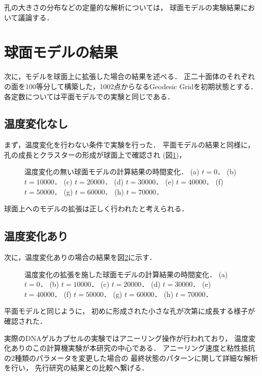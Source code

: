 孔の大きさの分布などの定量的な解析については，
球面モデルの実験結果において議論する．


\section{球面モデルの結果}
次に，モデルを球面上に拡張した場合の結果を述べる．
正二十面体のそれぞれの面を100等分して構築した，1002点からなるGeodesic Gridを初期状態とする．
各定数については平面モデルでの実験と同じである．


\subsection{温度変化なし}
まず，温度変化を行わない条件で実験を行った．
平面モデルの結果と同様に，
孔の成長とクラスターの形成が球面上で確認され
(図\ref{fig:result_sphere_without_anearing})，
\begin{figure}
    \centering
    
    \caption{
        温度変化の無い球面モデルの計算結果の時間変化．
        (a) $t=0$．
        (b) $t=10000$．
        (c) $t=20000$．
        (d) $t=30000$．
        (e) $t=40000$．
        (f) $t=50000$．
        (g) $t=60000$．
        (h) $t=70000$．
    }
    \label{fig:result_sphere_without_anearing}
\end{figure}
球面上へのモデルの拡張は正しく行われたと考えられる．


\subsection{温度変化あり}
次に，温度変化ありの場合の結果を図\ref{fig:result_sphere_with_anearing}に示す．
\begin{figure}
    \centering
    
    \caption{
        温度変化の拡張を施した球面モデルの計算結果の時間変化．
        (a) $t=0$．
        (b) $t=10000$．
        (c) $t=20000$．
        (d) $t=30000$．
        (e) $t=40000$．
        (f) $t=50000$．
        (g) $t=60000$．
        (h) $t=70000$．
    }
    \label{fig:result_sphere_with_anearing}
\end{figure}
平面モデルと同じように，
初めに形成された小さな孔が次第に成長する様子が確認された．

実際のDNAゲルカプセルの実験ではアニーリング操作が行われており，
温度変化ありのこの計算機実験が本研究の中心である．
アニーリング速度と粘性抵抗の2種類のパラメータを変更した場合の
最終状態のパターンに関して詳細な解析を行い，
先行研究の結果との比較へ繋げる．


